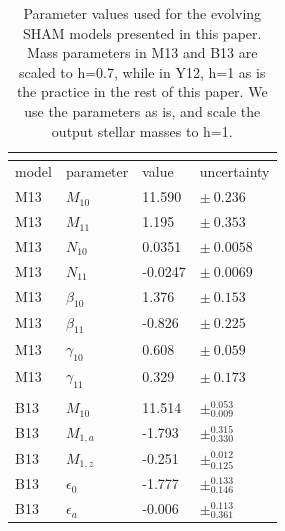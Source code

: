 \documentclass[a4paper,fleqn,usenatbib]{mnras}
\begin{document}
\begin{table}
\label{table:model_parameters}
\caption{Parameter values used for the evolving SHAM models presented in this paper. Mass parameters in M13 and B13 are scaled to h=0.7, while in Y12, h=1 as is the practice in the rest of this paper.  We use the parameters as is, and scale the output stellar masses to h=1.}
\begin{tabular}{ |p{1.5cm}|p{1.6cm}|p{1.2cm}|p{2cm}}
\multicolumn{4}{|c|}{} \\
\hline
model & parameter & value & uncertainty \\
\hline
\hline
M13		& $M_{10}$ 		&  11.590 		& $\pm~0.236$ 			\\%
M13 		& $M_{11}$ 		&  1.195  		& $\pm~0.353$			\\%
M13 		& $N_{10}$ 		&  0.0351 		& $\pm~0.0058$			\\%
M13 		& $N_{11}$ 		&  -0.0247		& $\pm~0.0069$			\\%
M13 		& $\beta_{10}$ 		&  1.376 		& $\pm~0.153$			\\%
M13 		& $\beta_{11}$ 		& -0.826  		& $\pm~0.225$ 			\\%
M13 		& $\gamma_{10}$ 	&  0.608 		& $\pm~0.059$			\\%
M13 		& $\gamma_{11}$ 	&  0.329 		& $\pm~0.173$ 			\\%
\\
B13		& $M_{10}$ 		&  11.514 		& $\pm^{0.053}_{0.009}$ 	\\%
B13		& $M_{1,a}$ 		&  -1.793 		& $\pm^{0.315}_{0.330}$ 	\\%
B13		& $M_{1,z}$ 		&  -0.251		& $\pm^{0.012}_{0.125}$ 	\\%
B13		& $\epsilon_{0}$ 	&  -1.777		& $\pm^{0.133}_{0.146}$ 	\\%
B13		& $\epsilon_{a}$ 	&  -0.006		& $\pm^{0.113 }_{0.361}$ 	\\%

\end{tabular}
\end{table}
\end{document}
